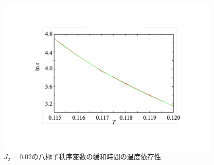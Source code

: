 \documentclass[12pt,titlepage,dvipdfmx]{jarticle}
\begin{document}
\begin{figure}[H]
   \centering
   \includegraphics[width=12cm]{figure/octupole_Tc_j2_0.02.pdf}
   \caption{$J_2=0.02$の八極子秩序変数の緩和時間の温度依存性}
\end{figure}


%

\newpage
\end{document}
